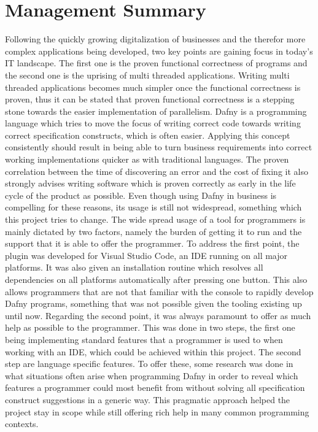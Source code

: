 \section{Management Summary}
Following the quickly growing digitalization of businesses and the therefor more complex applications being developed, two key points are gaining focus in today's IT landscape. The first one is the proven functional correctness of programs and the second one is the uprising of multi threaded applications. Writing multi threaded applications becomes much simpler once the functional correctness is proven, thus it can be stated that proven functional correctness is a stepping stone towards the easier implementation of parallelism. Dafny is a programming language which tries to move the focus of writing correct code towards writing correct specification constructs, which is often easier. Applying this concept consistently should result in being able to turn business requirements into correct working implementations quicker as with traditional languages. The proven correlation between the time of discovering an error and the cost of fixing it also strongly advises writing software which is proven correctly as early in the life cycle of the product as possible. Even though using Dafny in business is compelling for these reasons, its usage is still not widespread, something which this project tries to change.\newline
The wide spread usage of a tool for programmers is mainly dictated by two factors, namely the burden of getting it to run and the support that it is able to offer the programmer. \newline
To address the first point, the plugin was developed for Visual Studio Code, an IDE running on all major platforms. It was also given an installation routine which resolves all dependencies on all platforms automatically after pressing one button. This also allows programmers that are not that familiar with the console to rapidly develop Dafny programs, something that was not possible given the tooling existing up until now. \newline
Regarding the second point, it was always paramount to offer as much help as possible to the programmer. This was done in two steps, the first one being implementing standard features that a programmer is used to when working with an IDE, which could be achieved within this project. The second step are language specific features. To offer these, some research was done in what situations often arise when programming Dafny in order to reveal which features a programmer could most benefit from without solving all specification construct suggestions in a generic way. This pragmatic approach helped the project stay in scope while still offering rich help in many common programming contexts. \newline
